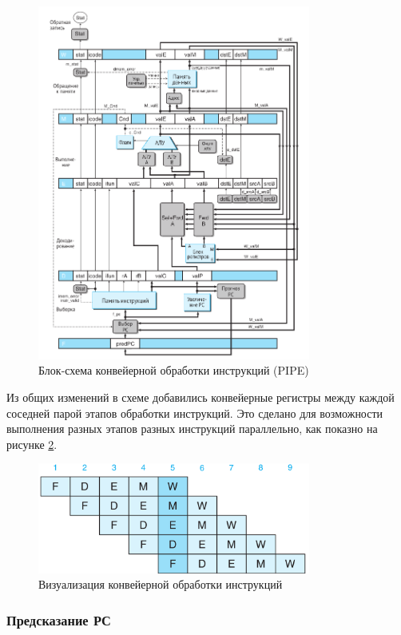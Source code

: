 \documentclass[12pt,a4paper]{article}
\begin{document}
\begin{figure}[h!]
\centering
\includegraphics[width=0.8\textwidth]{pipe.png}
\caption{Блок-схема конвейерной обработки инструкций (PIPE)}
\label{fig:pipe}
\end{figure}

Из общих изменений в схеме добавились конвейерные регистры между каждой соседней парой этапов обработки инструкций. Это сделано для возможности выполнения разных этапов разных инструкций параллельно, как показно на рисунке \ref{fig:pipeline}.

\begin{figure}[h!]
    \centering
    \includegraphics[width=0.8\textwidth]{pipeline.png}
    \caption{Визуализация конвейерной обработки инструкций}
    \label{fig:pipeline}
\end{figure}

\subsubsection{Предсказание РС}
\end{document}
